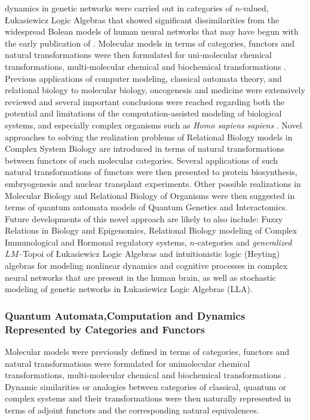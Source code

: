 \documentclass[12pt]{article}
\theoremstyle{plain}
\theoremstyle{definition}
\theoremstyle{plain}
\numberwithin{equation}{section}
\begin{document}
dynamics in genetic networks were carried out in categories of $n$-valued, \L ukasiewicz Logic
Algebras that showed significant dissimilarities \cite{ICB77} from the widespread Bolean models of human
neural networks that may have begun with the early publication of \cite{MP45}. Molecular models in terms of categories, functors and natural transformations were then formulated for uni-molecular chemical transformations, multi-molecular chemical and biochemical transformations \cite{ICB2k4a}. Previous applications of computer modeling, classical automata theory, and relational biology to molecular biology, oncogenesis and medicine were extensively reviewed and several important conclusions were reached regarding both the potential and limitations of the computation-assisted modeling of
biological systems, and especially complex organisms such as \emph{Homo sapiens sapiens} \cite{ICB87}. Novel approaches to solving the realization problems of Relational Biology models in Complex System Biology are introduced in terms of natural transformations between functors of such molecular categories. Several applications of such natural transformations of functors were then presented to protein biosynthesis, embryogenesis and nuclear transplant
experiments. Other possible realizations in Molecular Biology and Relational Biology of
Organisms were then suggested in terms of quantum automata models of Quantum Genetics and
Interactomics. Future developments of this novel approach are likely to also include: Fuzzy
Relations in Biology and Epigenomics, Relational Biology modeling of Complex Immunological
and Hormonal regulatory systems, $n$-categories and \emph{generalized $LM$}--Topoi of 
\L{}ukasiewicz Logic Algebras and intuitionistic logic (Heyting) algebras for modeling nonlinear dynamics and cognitive processes in complex neural networks that are present in the human brain, as well as stochastic modeling of
genetic networks in \L{}ukasiewicz Logic Algebras (LLA). 

\subsubsection{Quantum Automata,Computation and Dynamics Represented by Categories and Functors} 

Molecular models were previously defined in terms of categories, functors and natural transformations were
formulated for unimolecular chemical transformations, multi-molecular chemical and biochemical transformations 
\cite{ICB2k4}. Dynamic similarities or analogies between categories of classical, quantum or complex systems and their transformations were then naturally represented in terms of adjoint functors and the corresponding natural equivalences.  
\end{document}
